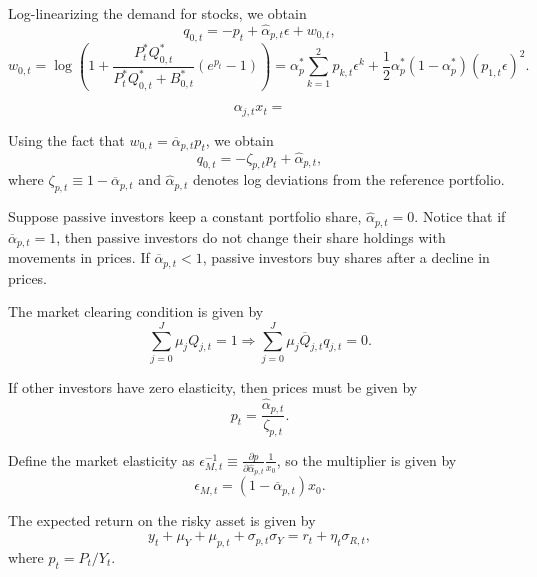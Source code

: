 \documentclass[11pt,english]{article}
\begin{document}
Log-linearizing the demand for stocks, we obtain
\begin{equation}
    q_{0,t} = - p_t +   \hat{\alpha}_{p,t} \epsilon + w_{0,t},
\end{equation}
\begin{equation}
w_{0,t} = \log \left( 1 + \frac{P_t^{*} Q_{0,t}^{*} }{P_t^* Q_{0,t}^* + B_{0,t}^*}(e^{p_{t} } -1)\right) = \alpha_{p}^* \sum_{k=1}^2p_{k,t}\epsilon^ k + \frac{1}{2} \alpha_p^* (1-\alpha_p^*) (p_{1,t} \epsilon)^2.
\end{equation}

\begin{equation}
    \alpha_{j,t} x_t = 
\end{equation}


Using the fact that $w_{0,t} = \overline{\alpha}_{p,t} p_{t}$, we obtain
\begin{equation}
    q_{0,t} = - \zeta_{p,t} p_t + \hat{\alpha}_{p,t},
\end{equation}
where $\zeta_{p,t} \equiv 1 - \overline{\alpha}_{p,t}$ and 
$\hat{\alpha}_{p,t}$ denotes log deviations from the reference portfolio. 

Suppose passive investors keep a constant portfolio share, $\hat{\alpha}_{p,t} = 0$. 
Notice that if $\overline{\alpha}_{p,t} = 1$, then passive investors do not change their share holdings with movements in prices. If $\overline{\alpha}_{p,t} < 1$, passive investors buy shares after a decline in prices. 

The market clearing condition is given by 
\begin{equation}
    \sum_{j=0}^J \mu_j Q_{j,t} = 1 \Rightarrow \sum_{j=0}^J \mu_j \overline{Q}_{j,t} q_{j,t} = 0.
\end{equation}

If other investors have zero elasticity, then prices must be given by 
\begin{equation}
    p_t = \frac{\hat{\alpha}_{p,t}}{\zeta_{p,t}}.
\end{equation}

Define the market elasticity as $\epsilon_{M,t}^{-1} \equiv \frac{\partial p}{\partial \hat{\alpha}_{p,t}} \frac{1}{x_0}$, so the multiplier is given by
\begin{equation}
    \epsilon_{M,t} = (1-\overline{\alpha}_{p,t}) x_0.
\end{equation}


The expected return on the risky asset is given by
\begin{equation}
    y_t + \mu_{Y} + \mu_{p,t} + \sigma_{p,t} \sigma_{Y} = r_t + \eta_t \sigma_{R,t},
\end{equation}
where $p_t = P_t/ Y_t$.
\end{document}
